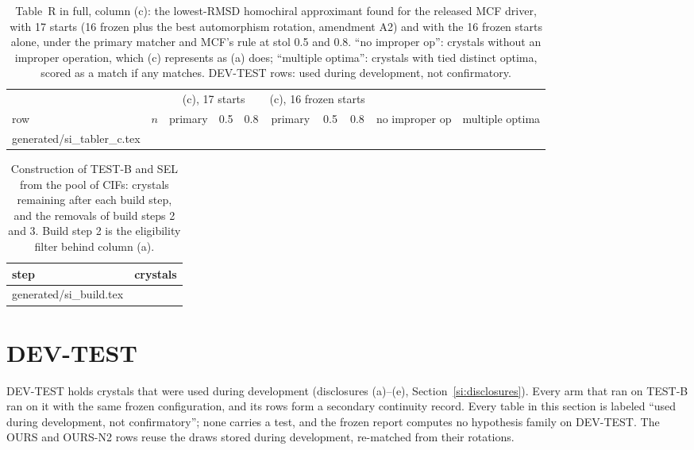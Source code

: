 \documentclass[journal=acsodf,manuscript=article]{achemso}
\makeatletter
\newcommand{\inputrows}[1]{\@@input #1 }
\makeatother
\begin{document}
\begin{table}[htbp]
\caption{Table~R in full, column (c): the lowest-RMSD homochiral approximant found for the released MCF
driver, with 17 starts (16 frozen plus the best automorphism rotation, amendment A2) and with
the 16 frozen starts alone, under the primary matcher and MCF's rule at stol 0.5 and 0.8.
``no improper op'': crystals without an improper operation, which (c) represents as (a) does;
``multiple optima'': crystals with tied distinct optima, scored as a match if any matches.
DEV-TEST rows: used during development, not confirmatory.}
\label{tab:si_tabler_c}
\centering
\footnotesize
\setlength{\tabcolsep}{3pt}
\begin{tabular}{@{}lrccccccrr@{}}
\toprule
 & & \multicolumn{3}{c}{(c), 17 starts} & \multicolumn{3}{c}{(c), 16 frozen starts} & & \\
\cmidrule(lr){3-5}\cmidrule(lr){6-8}
row & $n$ & primary & 0.5 & 0.8 & primary & 0.5 & 0.8 & no improper op & multiple optima \\
\midrule
\inputrows{generated/si_tabler_c.tex}
\bottomrule
\end{tabular}
\end{table}

\begin{table}[htbp]
\caption{Construction of TEST-B and SEL from the pool of CIFs: crystals remaining after each
build step, and the removals of build steps 2 and 3. Build step 2 is the eligibility filter
behind column (a).}
\label{tab:si_build}
\centering
\small
\begin{tabular}{@{}lr@{}}
\toprule
step & crystals \\
\midrule
\inputrows{generated/si_build.tex}
\bottomrule
\end{tabular}
\end{table}

\clearpage
\section{DEV-TEST}\label{si:devtest}
DEV-TEST holds \svNDev{} crystals that were used during development (disclosures (a)--(e),
Section~\ref{si:disclosures}). Every arm that ran on TEST-B ran on it with the same frozen
configuration, and its rows form a secondary continuity record. Every table in this section is
labeled ``used during development, not confirmatory''; none carries a test, and the frozen
report computes no hypothesis family on DEV-TEST. The OURS and OURS-N2 rows reuse the draws
stored during development, re-matched from their rotations.
\end{document}
